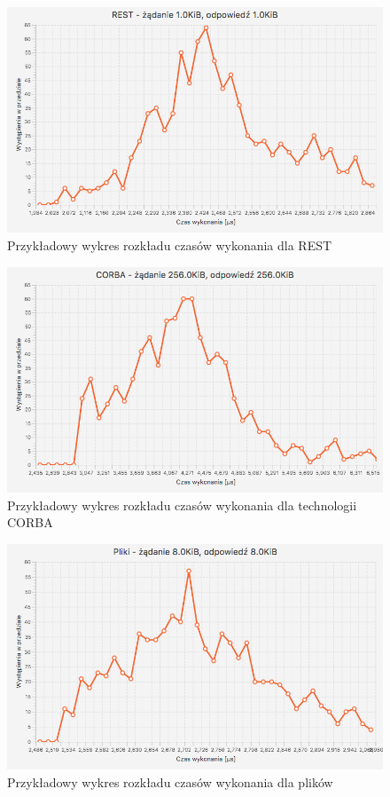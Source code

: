 \begin{figure}[H]
    \centering
    \includegraphics[scale=0.38]{img/charts/REST_chart_1024_1024.png}
    \caption{Przykładowy wykres rozkładu czasów wykonania dla REST}
\end{figure}

\begin{figure}[H]
    \centering
    \includegraphics[scale=0.38]{img/charts/CORBA_chart_262144_262144.png}
    \caption{Przykładowy wykres rozkładu czasów wykonania dla technologii CORBA}
\end{figure}

\begin{figure}[H]
    \centering
    \includegraphics[scale=0.38]{img/charts/FILE_chart_8192_8192.png}
    \caption{Przykładowy wykres rozkładu czasów wykonania dla plików}
\end{figure}

